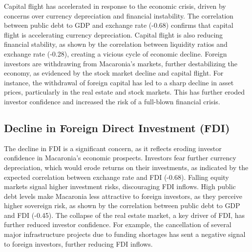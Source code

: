 Capital flight has accelerated in response to the economic crisis, driven by concerns over currency depreciation and financial instability. The correlation between public debt to GDP and exchange rate (-0.68) confirms that capital flight is accelerating currency depreciation. Capital flight is also reducing financial stability, as shown by the correlation between liquidity ratios and exchange rate (-0.28), creating a vicious cycle of economic decline. Foreign investors are withdrawing from Macaronia's markets, further destabilizing the economy, as evidenced by the stock market decline and capital flight.
For instance, the withdrawal of foreign capital has led to a sharp decline in asset prices, particularly in the real estate and stock markets. This has further eroded investor confidence and increased the risk of a full-blown financial crisis.

\subsection{ Decline in Foreign Direct Investment (FDI)}
The decline in FDI is a significant concern, as it reflects eroding investor confidence in Macaronia's economic prospects. Investors fear further currency depreciation, which would erode returns on their investments, as indicated by the expected correlation between exchange rate and FDI (-0.68). Falling equity markets signal higher investment risks, discouraging FDI inflows. High public debt levels make Macaronia less attractive to foreign investors, as they perceive higher sovereign risk, as shown by the correlation between public debt to GDP and FDI (-0.45). The collapse of the real estate market, a key driver of FDI, has further reduced investor confidence.
For example, the cancellation of several major infrastructure projects due to funding shortages has sent a negative signal to foreign investors, further reducing FDI inflows.


